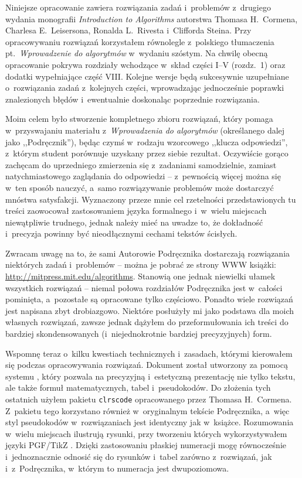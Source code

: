 
Niniejsze opracowanie zawiera rozwiązania zadań i~problemów z~drugiego wydania monografii \textsl{Introduction to Algorithms} \cite{cormen} autorstwa Thomasa H.\ Cormena, Charlesa E.\ Leisersona, Ronalda L.\ Rivesta i~Clifforda Steina.
Przy opracowywaniu rozwiązań korzystałem równolegle z~polskiego tłumaczenia pt.\ \textsl{Wprowadzenie do algorytmów} \cite{cormenpl} w~wydaniu szóstym.
Na chwilę obecną opracowanie pokrywa rozdziały wchodzące w~skład części I--V (rozdz.\ 1) oraz dodatki wypełniające część VIII.
Kolejne wersje będą sukcesywnie uzupełniane o~rozwiązania zadań z~kolejnych części, wprowadzając jednocześnie poprawki znalezionych błędów i~ewentualnie doskonaląc poprzednie rozwiązania.

Moim celem było stworzenie kompletnego zbioru rozwiązań, który pomaga w~przyswajaniu materiału z~\textsl{Wprowadzenia do algorytmów} (określanego dalej jako ,,Podręcznik''), będąc czymś w~rodzaju wzorcowego ,,klucza odpowiedzi'', z~którym student porównuje uzyskany przez siebie rezultat.
Oczywiście gorąco zachęcam do uprzedniego zmierzenia się z~zadaniami samodzielnie, zamiast natychmiastowego zaglądania do odpowiedzi -- z~pewnością więcej można się w~ten sposób nauczyć, a~samo rozwiązywanie problemów może dostarczyć mnóstwa satysfakcji.
Wyznaczony przeze mnie cel rzetelności przedstawionych tu treści zaowocował zastosowaniem języka formalnego i~w~wielu miejscach niewątpliwie trudnego, jednak należy mieć na uwadze to, że dokładność i~precyzja powinny być nieodłącznymi cechami tekstów ścisłych.

Zwracam uwagę na to, że sami Autorowie Podręcznika dostarczają rozwiązania niektórych zadań i~problemów -- można je pobrać ze strony WWW książki: \url{http://mitpress.mit.edu/algorithms}.
Stanowią one jednak niewielki ułamek wszystkich rozwiązań -- niemal połowa rozdziałów Podręcznika jest w~całości pominięta, a~pozostałe są opracowane tylko częściowo.
Ponadto wiele rozwiązań jest napisana zbyt drobiazgowo.
Niektóre posłużyły mi jako podstawa dla moich własnych rozwiązań, zawsze jednak dążyłem do przeformułowania ich treści do bardziej skondensowanych (i~niejednokrotnie bardziej precyzyjnych) form.

Wspomnę teraz o~kilku kwestiach technicznych i~zasadach, którymi kierowałem się podczas opracowywania rozwiązań.
Dokument został utworzony za pomocą systemu \LaTeXe, który pozwala na precyzyjną i~estetyczną prezentację nie tylko tekstu, ale także formuł matematycznych, tabel i~pseudokodów.
Do złożenia tych ostatnich użyłem pakietu \texttt{clrscode} opracowanego przez Thomasa H.\ Cormena.
Z~pakietu tego korzystano również w~oryginalnym tekście Podręcznika, a~więc styl pseudokodów w~rozwiązaniach jest identyczny jak w~książce.
Rozumowania w~wielu miejscach ilustrują rysunki, przy tworzeniu których wykorzystywałem języki PGF/TikZ \cite{pgfmanual}.
Dzięki zastosowaniu płaskiej numeracji mogę równocześnie i~jednoznacznie odnosić się do rysunków i~tabel zarówno z~rozwiązań, jak i~z~Podręcznika, w~którym to numeracja jest dwupoziomowa.


